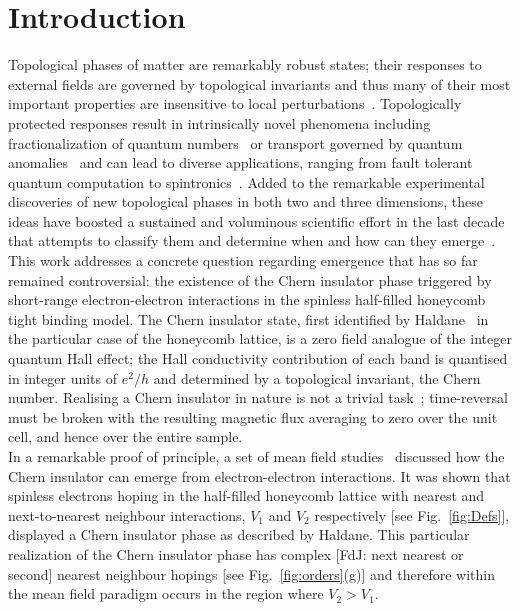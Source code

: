 \documentclass[aps,prx,10pt,twocolumn,floatfix,superscriptaddress,showpacs,numerical,footinbib]{revtex4-1}
\newcommand{\noteFdJ}[1]{{\color{cyan} [FdJ: #1]}}
\begin{document}
\section{Introduction}
%
Topological phases of matter are remarkably robust states; their responses to external fields are
governed by topological invariants and thus many of their most important properties are insensitive to local perturbations~\cite{HK10,QZ11}.
%
Topologically protected responses result in intrinsically novel phenomena
including fractionalization of quantum numbers~\cite{Nayak2008} or transport governed by quantum anomalies~\cite{V03}
and can lead to diverse applications, ranging from fault tolerant quantum computation to spintronics~\cite{HK10,QZ11,Nayak2008}.
%
Added to the remarkable experimental discoveries of new topological phases in both two and three dimensions,
these ideas have boosted a sustained and voluminous scientific effort in the last decade that attempts to classify them 
and determine when and how can they emerge~\cite{S14}.\\
%
This work addresses a concrete question regarding emergence that has so far remained controversial: 
the existence of the Chern insulator phase triggered by short-range electron-electron interactions in the
spinless half-filled honeycomb tight binding model.
%
The Chern insulator state, first identified by Haldane~\cite{H88} in the particular case of the honeycomb lattice, is a zero field analogue of the
integer quantum Hall effect; the Hall conductivity contribution of each band is quantised in integer units of $e^2/h$ and determined by a topological invariant, the Chern number.
%
Realising a Chern insulator in nature is not a trivial task~\cite{CZF13}; time-reversal must be broken with
the resulting magnetic flux averaging to zero over the unit cell, and hence over the entire sample.\\
%
In a remarkable proof of principle, a set of mean field studies~\cite{RQHZ08,WF10,GCC13} 
discussed how the Chern insulator can emerge from electron-electron interactions. 
%
It was shown that spinless electrons hoping in the half-filled honeycomb lattice with nearest and next-to-nearest neighbour interactions, $V_{1}$ and $V_{2}$ respectively 
[see Fig.~\ref{fig:Defs}], displayed a Chern insulator phase as described by Haldane.
%
This particular realization of the Chern insulator phase has complex \noteFdJ{next nearest or second} nearest neighbour hopings [see Fig.~\ref{fig:orders}(g)]
and therefore within the mean field paradigm occurs in the region where $V_{2}>V_{1}$.
\end{document}
